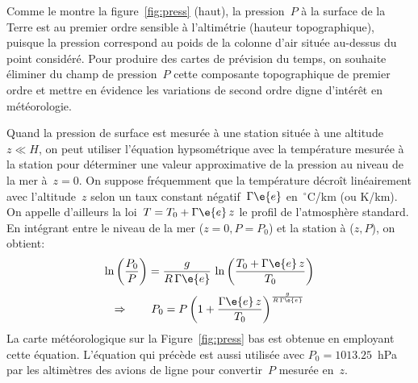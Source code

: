 \sk
Comme le montre la figure~\ref{fig:press} (haut), la pression~$P$ à la surface de la Terre est au premier ordre sensible à l'altimétrie (hauteur topographique), puisque la pression correspond au poids de la colonne d'air située au-dessus du point considéré. Pour produire des cartes de prévision du temps, on souhaite éliminer du champ de pression~$P$ cette composante topographique de premier ordre et mettre en évidence les variations de second ordre digne d'intérêt en météorologie.


\sk
Quand la pression de surface est mesurée à une station située à une altitude~$z \ll H$, on peut utiliser l'équation hypsométrique avec la température mesurée à la station pour déterminer une valeur approximative de la pression au niveau de la mer à~$z=0$. On suppose fréquemment que la température décroît linéairement avec l'altitude~$z$ selon un taux constant négatif~$\Gamma\e{e}$ en~$^{\circ}$C/km (ou K/km). On appelle d'ailleurs la loi~$T = T_0 + \Gamma\e{e} \, z$ le profil de l'atmosphère standard. En intégrant entre le niveau de la mer ($z=0, P=P_0$) et la station à ($z,P$), on obtient:
\[ \ln \left( \frac{P_0}{P} \right) = \frac{g}{R \, \Gamma\e{e}} \, \ln \left( \frac{T_0 + \Gamma\e{e} \, z}{T_0} \right) \]
\[ \Rightarrow \qquad P_0 = P \left( 1 + \frac{\Gamma\e{e} \, z}{T_0} \right)^{\frac{g}{R\,\Gamma\e{e}}} \]
La carte météorologique sur la Figure~\ref{fig:press} bas est obtenue en employant cette équation. L'équation qui précède est aussi utilisée avec $P_0=1013.25$~hPa par les altimètres des avions de ligne pour convertir~$P$ mesurée en~$z$.

